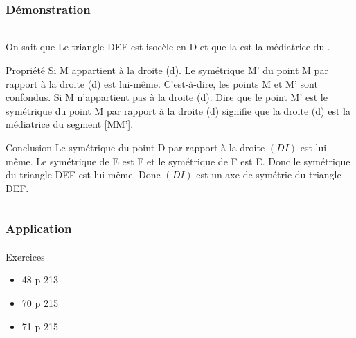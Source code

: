 \documentclass{beamer}
\begin{document}
\begin{frame}
\frametitle{Démonstration}  
\framesubtitle{}
	
\begin{columns}[c]
	
	
	\begin{column}{12cm}
		
		\begin{block}{On sait que}
			\small{Le triangle DEF est isocèle en D et que la  est la médiatrice du .}\pause
		\end{block}
		
		\begin{block}{Propriété}
			\small{Si M appartient à la droite (d).
			Le symétrique M' du point M par rapport à la droite (d) est lui-même.
			C'est-à-dire, les points M et M' sont confondus.
			Si M n'appartient pas à la droite (d).
			Dire que le point M' est le symétrique du point M par rapport à la droite (d) signifie que la droite (d) est la médiatrice du segment [MM'].}\pause
		\end{block}
		
		\begin{block}{Conclusion}
			\small{Le symétrique du point D par rapport à la droite $(DI)$ est lui-même.
			Le symétrique de E est F et le symétrique de F est E.
			Donc le symétrique du triangle DEF est lui-même.
			Donc $(DI)$ est un axe de symétrie du triangle DEF.}
		\end{block}
		
	\end{column}
	
	
\end{columns}
	
\end{frame}

\begin{frame}
	\frametitle{Application}  
	\framesubtitle{}
	
	\begin{block}{Exercices}
		\begin{itemize}
			\item 48 p 213
			\item 70 p 215
			\item 71 p 215
		\end{itemize}
	\end{block}
\end{frame}
\end{document}
